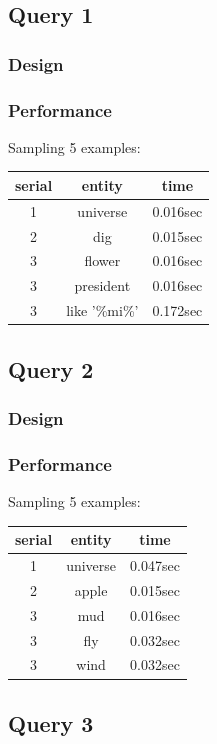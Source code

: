\documentclass[12pt]{article}
\begin{document}
\subsection{Query 1}
\subsubsection{Design}
\subsubsection{Performance}
Sampling 5 examples:
\begin{center}
  \begin{tabular}{ | c | c | c |}
    \hline
    serial & entity & time \\ \hline\hline
    1 & universe & 0.016sec \\ \hline
    2 & dig & 0.015sec \\ \hline
    3 & flower & 0.016sec \\ \hline
    3 & president & 0.016sec \\ \hline
    3 & like '\%mi\%' & 0.172sec \\
    \hline
  \end{tabular}
\end{center}
\subsection{Query 2}
\subsubsection{Design}
\subsubsection{Performance}
Sampling 5 examples:
\begin{center}
  \begin{tabular}{ | c | c | c |}
    \hline
    serial & entity & time \\ \hline\hline
    1 & universe & 0.047sec \\ \hline
    2 & apple & 0.015sec \\ \hline
    3 & mud & 0.016sec \\ \hline
    3 & fly & 0.032sec \\ \hline
    3 & wind & 0.032sec \\
    \hline
  \end{tabular}
\end{center}
\subsection{Query 3}
\end{document}
